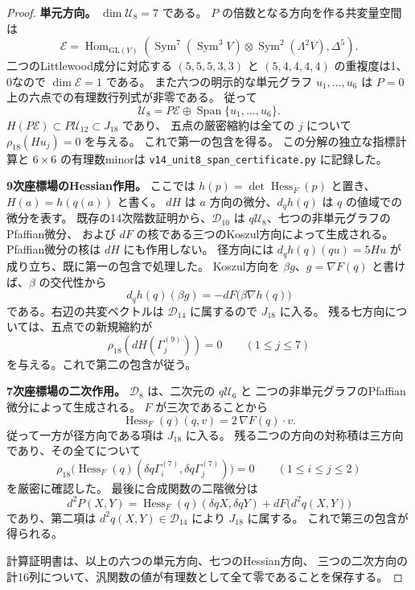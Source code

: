 \documentclass[a4paper,11pt]{ltjsarticle}
\theoremstyle{definition}
\begin{document}
\begin{proof}
\textbf{単元方向。}
$\dim\mathcal U_8=7$ である。
$P$ の倍数となる方向を作る共変量空間は
\[
 \mathcal E=
 \operatorname{Hom}_{\mathrm{GL}(V)}
 \left(\operatorname{Sym}^7(\operatorname{Sym}^3V)
 \otimes\operatorname{Sym}^2(\Lambda^2V),\Delta^5\right).
\]
二つのLittlewood成分に対応する
$(5,5,5,3,3)$ と $(5,4,4,4,4)$ の重複度は1、0なので
$\dim\mathcal E=1$ である。
また六つの明示的な単元グラフ $u_1,\ldots,u_6$ は
$P=0$ 上の六点での有理数行列式が非零である。
従って
\[
 \mathcal U_8=P\mathcal E\oplus
             \operatorname{Span}\{u_1,\ldots,u_6\}.
\]
$H(P\mathcal E)\subset P\mathcal U_{12}\subset J_{18}$ であり、
五点の厳密縮約は全ての $j$ について $\rho_{18}(Hu_j)=0$ を与える。
これで第一の包含を得る。
この分解の独立な指標計算と $6\times6$ の有理数minorは
\texttt{v14\_unit8\_span\_certificate.py} に記録した。

\textbf{9次座標場のHessian作用。}
ここでは $h(p)=\det\operatorname{Hess}_F(p)$ と置き、
$H(a)=h(q(a))$ と書く。
$dH$ は $a$ 方向の微分、$d_qh(q)$ は $q$ の値域での微分を表す。
既存の14次階数証明から、$\mathcal D_{10}$ は
$q\mathcal U_8$、七つの非単元グラフのPfaffian微分、
および $dF$ の核である三つのKoszul方向によって生成される。
Pfaffian微分の核は $dH$ にも作用しない。
径方向には $d_qh(q)(q u)=5Hu$ が成り立ち、既に第一の包含で処理した。
Koszul方向を $\beta g$、$g=\nabla F(q)$ と書けば、$\beta$ の交代性から
\[
 d_qh(q)(\beta g)=-dF\bigl(\beta\nabla h(q)\bigr)
\]
である。右辺の共変ベクトルは $\mathcal D_{14}$ に属するので $J_{18}$ に入る。
残る七方向については、五点での新規縮約が
\[
 \rho_{18}(dH(\Gamma_j^{(9)}))=0\qquad(1\le j\le7)
\]
を与える。これで第二の包含が従う。

\textbf{7次座標場の二次作用。}
$\mathcal D_8$ は、二次元の $q\mathcal U_6$ と
二つの非単元グラフのPfaffian微分によって生成される。
$F$ が三次であることから
\[
 \operatorname{Hess}_F(q)(q,v)=2\,\nabla F(q)\cdot v.
\]
従って一方が径方向である項は $J_{18}$ に入る。
残る二つの方向の対称積は三方向であり、その全てについて
\[
 \rho_{18}\bigl(\operatorname{Hess}_F(q)
       (\delta q\Gamma_i^{(7)},\delta q\Gamma_j^{(7)})\bigr)=0
 \qquad(1\le i\le j\le2)
\]
を厳密に確認した。
最後に合成関数の二階微分は
\[
 d^2P(X,Y)=\operatorname{Hess}_F(q)(\delta qX,\delta qY)
          +dF\bigl(d^2q(X,Y)\bigr)
\]
であり、第二項は $d^2q(X,Y)\in\mathcal D_{14}$ により $J_{18}$ に属する。
これで第三の包含が得られる。

計算証明書は、以上の六つの単元方向、七つのHessian方向、
三つの二次方向の計16列について、汎関数の値が有理数として全て零であることを保存する。
\end{proof}
\end{document}

